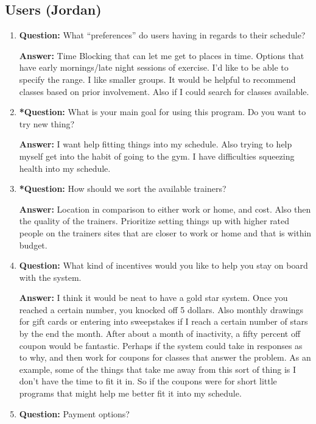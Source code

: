 \documentclass[12pt]{article}
\begin{document}
\subsection{Users (Jordan)}
\begin{enumerate}
\item \textbf{Question:} What “preferences” do users having in regards to their schedule?

\textbf{Answer:} Time Blocking that can let me get to places in time. Options that have early mornings/late night sessions of exercise. I’d like to be able to specify the range. I like smaller groups. It would be helpful to recommend classes based on prior involvement.  Also if I could search for classes available.

\item \textbf{*Question:}  What is your main goal for using this program.  Do you want to try new thing?

\textbf{Answer:} I want help fitting things into my schedule.  Also trying to help myself get into the habit of going to the gym.  I have difficulties squeezing health into my schedule.

\item \textbf{*Question:} How should we sort the available trainers?  

\textbf{Answer:} Location in comparison to either work or home, and cost. Also then the quality of the trainers.  Prioritize setting things up with higher rated people on the trainers sites that are closer to work or home and that is within budget.

\item \textbf{Question:}  What kind of incentives would you like to help you stay on board with the system.

\textbf{Answer:} I think it would be neat to have a gold star system. Once you reached a certain number,  you knocked off 5 dollars. Also monthly drawings for gift cards or entering into sweepstakes if I reach a certain number of stars by the end the month.  After about a month of inactivity, a fifty percent off coupon would be fantastic. Perhaps if the system could take in responses as to why, and then work for coupons for classes that answer the problem. As an example, some of the things that take me away from this sort of thing is I don’t have the time to fit it in.  So if the coupons were for short little programs that might help me better fit it into my schedule.

\item \textbf{Question:}  Payment options?


\end{enumerate}
\end{document}
